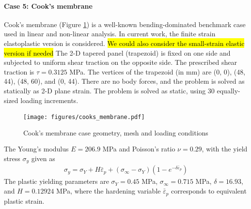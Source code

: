 \documentclass[sn-mathphys,Numbered,draft]{sn-jnl}%
\begin{document}
\paragraph{Case 5: Cook's membrane}
Cook's membrane (Figure \ref{fig:cooks_membrane}) is a well-known bending-dominated benchmark case used in linear and non-linear analysis.
In current work, the finite strain elastoplastic version \citep{Simo1992} is considered. \hl{We could also consider the small-strain elastic version if needed}
The 2-D tapered panel (trapezoid) is fixed on one side and subjected to uniform shear traction on the opposite side.
The prescribed shear traction is $\tau = 0.3125$ MPa.
The vertices of the trapezoid (in mm) are (0, 0), (48, 44), (48, 60),  and (0, 44).
There are no body forces, and the problem is solved as statically as 2-D plane strain.
The problem is solved as static, using 30 equally-sized loading increments.
\begin{figure}[htbp]
   \centering
   \texttt{[image: figures/cooks\_membrane.pdf]} 
   \caption{Cook's membrane case geometry, mesh and loading conditions}
   \label{fig:cooks_membrane}
\end{figure}

The Young's modulus $E = 206.9$ MPa and Poisson's ratio $\nu=0.29$, with the yield stress $\sigma_y$ given as \citep{Simo1992}
\begin{eqnarray}
	\sigma_y = \sigma_Y + H\bar{\varepsilon}_p + (\sigma_{\infty} - \sigma_Y)(1- e^{-\delta\bar{\varepsilon}_p})
\end{eqnarray}
The plastic yielding parameters are $\sigma_Y = 0.45$ MPa, $\sigma_{\infty} = 0.715$ MPa, $\delta = 16.93$, and $H = 0.12924$ MPa, where the hardening variable $\bar{\varepsilon}_p$ corresponds to equivalent plastic strain.
\end{document}
